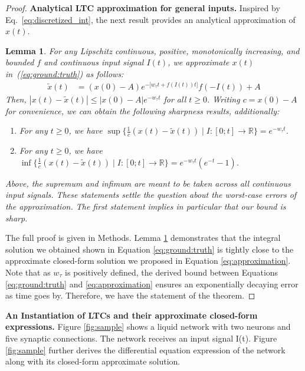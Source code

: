 \documentclass[12pt]{article}
\newtheorem{lemma}{Lemma}
\newcommand{\RE}{\mathbb{R}}
\begin{document}
\begin{proof}
\noindent \textbf{Analytical LTC approximation for general inputs.} Inspired by Eq.~\ref{eq:discretized_int}, the next result provides an analytical approximation of $x(t)$.

\begin{lemma}\label{lemma:approx}
For any Lipschitz continuous, positive, monotonically increasing, and bounded $f$ and continuous input signal $I(t)$, we approximate $x(t)$ in~(\ref{eq:ground:truth}) as follows:
\begin{align}
\tilde{x}(t) & = (x(0) - A) e^{-\big[ w_\tau t + f(I(t)) t \big]} f(-I(t)) + A \label{eq:approximation}
\end{align}
Then, $|x(t) - \tilde{x}(t)| \leq |x(0) - A| e^{-w_\tau t}$ for all $t \geq 0$. Writing $c = x(0) - A$ for convenience, we can obtain the following sharpness results, additionally:
\begin{enumerate}
    \item For any $t \geq 0$, we have $\sup\{ \tfrac{1}{c}(x(t) - \tilde{x}(t)) \mid I : [0;t] \to \RE \} = e^{-w_\tau t}$.
    \item For any $t \geq 0$, we have $\inf\{ \tfrac{1}{c}(x(t) - \tilde{x}(t)) \mid I : [0;t] \to \RE \} = e^{-w_\tau t} ( e^{-t} - 1)$.
\end{enumerate}
Above, the supremum and infimum are meant to be taken across all continuous input signals. These statements settle the question about the worst-case errors of the approximation. The first statement implies in particular that our bound is sharp.
\end{lemma}

\noindent The full proof is given in Methods. Lemma \ref{lemma:approx} demonstrates that the integral solution we obtained shown in Equation \ref{eq:ground:truth} is tightly close to the approximate closed-form solution we proposed in Equation \ref{eq:approximation}. Note that as $w_\tau$ is positively defined, the derived bound between Equations \ref{eq:ground:truth} and \ref{eq:approximation} ensures an exponentially decaying error as time goes by. 
\noindent Therefore, we have the statement of the theorem. 
\end{proof}

\noindent \textbf{An Instantiation of LTCs and their approximate closed-form expressions.} 
Figure \ref{fig:sample} shows a liquid network with two neurons and five synaptic connections. The network receives an input signal I(t). Figure \ref{fig:sample} further derives the differential equation expression of the network along with its closed-form approximate solution. 
\end{document}

